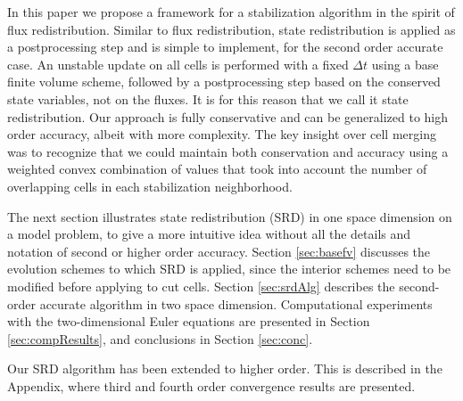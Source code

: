 In this paper we propose a framework for a stabilization algorithm in
the spirit of flux redistribution. Similar to flux redistribution, state
redistribution is applied as a postprocessing step and is simple to implement,
for the second order accurate case. An unstable update on all cells is
performed with a fixed $\Delta t$ using a base finite volume scheme, followed
by a postprocessing step based on the conserved state variables, not on the
fluxes.  It is for this reason that we call it state redistribution.  Our
approach is fully conservative and can be generalized to high order accuracy,
albeit with  more complexity. The key insight over cell merging was to
recognize that we could maintain both conservation and accuracy using a
weighted convex combination of values that took into account the number of
overlapping cells in each stabilization neighborhood.

The next section illustrates state redistribution (SRD) in one space dimension
on a model problem, to give a more intuitive idea without all the details and 
notation of second or higher order accuracy. 
Section \ref{sec:basefv} discusses the evolution schemes
to which SRD is applied, since the interior schemes need to be modified before
applying to cut cells. Section \ref{sec:srdAlg} describes the second-order accurate
algorithm in two space dimension.  Computational experiments with the
two-dimensional Euler equations  are presented in
Section \ref{sec:compResults}, and conclusions in Section \ref{sec:conc}. 

Our SRD  algorithm has been extended
to higher order. This is described in the Appendix, where third and fourth order
convergence results are presented.

